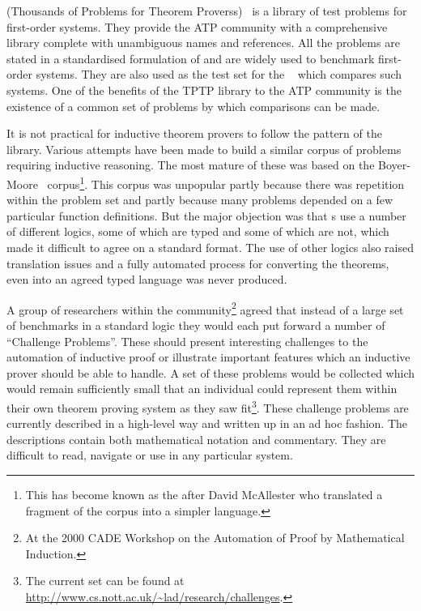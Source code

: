 {} (Thousands of Problems for Theorem Proverss)~\cite{Sutcliffe98} is a library of test problems for first-order
{} systems. They provide the ATP
community with a comprehensive library complete with unambiguous names and references.
All the problems are stated in a standardised formulation of
{} and are widely used to benchmark first-order systems.  They
are also used as the test set for the {}~\cite{Sutcliffe01} which
compares such systems.  One of the benefits of the TPTP library to the ATP community is
the existence of a common set of problems by which comparisons can be made.

It is not practical for inductive theorem provers to
follow the pattern of the {} library.  Various attempts have been made to
build a similar corpus of problems requiring inductive reasoning.  The most mature of
these was based on the Boyer-Moore~\cite{NQTHM}
corpus\footnote{This has become known as the
  {} after David McAllester who translated a fragment of the
  {\nqthm} corpus into a simpler language.}.  This corpus was unpopular partly because
there was repetition within the problem set and partly because many problems depended on a
few particular function definitions.  But the major objection was that
{s} use a number of different logics, some of which are
typed and some of which are not, which made it difficult to agree on a standard format.
The use of other logics also raised translation issues and a fully automated process for
converting the theorems, even into an agreed typed language was never produced.

A group of researchers within the community\footnote{At the 2000 CADE Workshop on the
  Automation of Proof by Mathematical Induction.}  agreed that instead of a large set of
benchmarks in a standard logic they would each put forward a number of ``Challenge
Problems''.  These should present interesting
challenges to the automation of inductive proof or illustrate important features which an
inductive prover should be able to handle.  A set of these problems would be collected
which would remain sufficiently small that an individual could represent them within their
own theorem proving system as they saw fit\footnote{The current set can be found at
  {\url{http://www.cs.nott.ac.uk/~lad/research/challenges}}.}.  These challenge problems
are currently described in a high-level way and written up in an ad hoc fashion.  The
descriptions contain both mathematical notation and commentary.  They are difficult to
read, navigate or use in any particular system.

